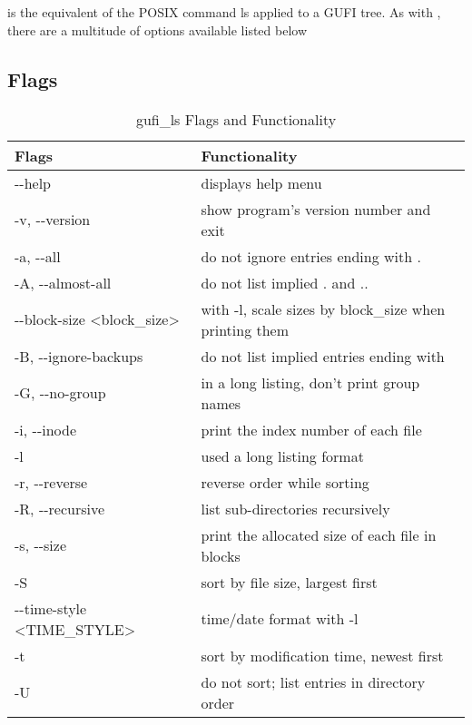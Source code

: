 \section{\gufils}
\gufils is the equivalent of the POSIX command ls applied to a GUFI
tree. As with \gufifind, there are a multitude of options available
listed below

\subsection{Flags}
\begin{table} [h!]
  \centering
  \begin{tabular}{| l | l |}
    \hline
    Flags & Functionality \\
    \hline
    -{}-help & displays help menu \\
    \hline
    -v, -{}-version & show program's version number and exit \\
    \hline
    -a, -{}-all & do not ignore entries ending with . \\
    \hline
    -A, -{}-almost-all & do not list implied . and .. \\
    \hline
    -{}-block-size \textless block\_size\textgreater & with -l, scale sizes by block\_size when printing them \\
    \hline
    -B, -{}-ignore-backups & do not list implied entries ending with ~ \\
    \hline
    -G, -{}-no-group & in a long listing, don't print group names \\
    \hline
    -i, -{}-inode & print the index number of each file \\
    \hline
    -l & used a long listing format \\
    \hline
    -r, -{}-reverse & reverse order while sorting \\
    \hline
    -R, -{}-recursive & list sub-directories recursively \\
    \hline
    -s, -{}-size & print the allocated size of each file in blocks \\
    \hline
    -S & sort by file size, largest first \\
    \hline
    -{}-time-style \textless TIME\_STYLE\textgreater & time/date format with -l \\
    \hline
    -t & sort by modification time, newest first \\
    \hline
    -U & do not sort; list entries in directory order \\
    \hline
  \end{tabular}
  \caption{\label{fig:gufi_ls flags}{gufi\_ls Flags and Functionality}}
\end{table}

